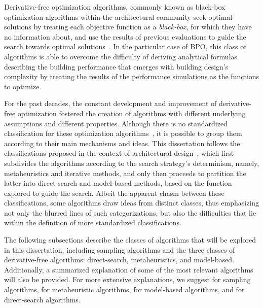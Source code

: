 	Derivative-free optimization algorithms, commonly known as black-box optimization algorithms within the architectural community \cite{Wortmann2016BBO} seek optimal solutions by treating each objective function as a \textit{black-box}, for which they have no information about, and use the results of previous evaluations to guide the search towards optimal solutions~\cite{Rios2013}. In the particular case of \ac{BPO}, this class of algorithms is able to overcome the difficulty of deriving analytical formulas describing the building performance that emerges with building design's complexity \cite{Machairas2014} by treating the results of the performance simulations as the functions to optimize. %
		
	For the past decades, the constant development and improvement of derivative-free optimization fostered the creation of algorithms with different underlying assumptions and different properties. Although there is no standardized classification for these optimization algorithms~\cite{Rios2013, Wortmann2017ADO}, it is possible to group them according to their main mechanisms and ideas. This dissertation follows the classifications proposed in the context of architectural design~\cite{Wortmann2015AdvSBO}, which first subdivides the algorithms according to the search strategy's determinism, namely, metaheuristics and iterative methods, and only then proceeds to partition the latter into direct-search and model-based methods, based on the function explored to guide the search. Albeit the apparent chasm between these classifications, some algorithms draw ideas from distinct classes, thus emphasizing not only the blurred lines of such categorizations, but also the difficulties that lie within the definition of more standardized classifications. 
	
	The following subsections describe the classes of algorithms that will be explored in this dissertation, including sampling algorithms and the three classes of derivative-free algorithms: direct-search, metaheuristics, and model-based. Additionally, a summarized explanation of some of the most relevant algorithms will also be provided. For more extensive explanations, we suggest \cite{Tille2006} for sampling algorithms, \cite{BlumRoli2003Metaheuristics, Glover2003Metaheuristics, Zhou2011} for metaheuristic algorithms, \cite{Koziel2011} for model-based algorithms, and \cite{Conn2009} for direct-search algorithms.
	
